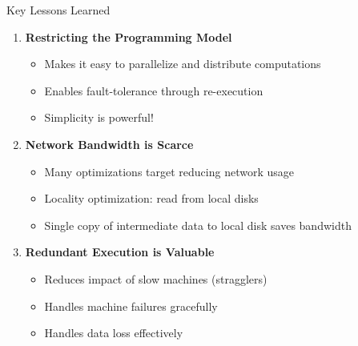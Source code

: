 \documentclass[aspectratio=169]{beamer}
\begin{document}
\begin{frame}{Key Lessons Learned}
\begin{enumerate}
    \item \textbf{Restricting the Programming Model}
    \begin{itemize}
        \item Makes it easy to parallelize and distribute computations
        \item Enables fault-tolerance through re-execution
        \item Simplicity is powerful!
    \end{itemize}

    \vspace{0.3cm}

    \item \textbf{Network Bandwidth is Scarce}
    \begin{itemize}
        \item Many optimizations target reducing network usage
        \item Locality optimization: read from local disks
        \item Single copy of intermediate data to local disk saves bandwidth
    \end{itemize}

    \vspace{0.3cm}

    \item \textbf{Redundant Execution is Valuable}
    \begin{itemize}
        \item Reduces impact of slow machines (stragglers)
        \item Handles machine failures gracefully
        \item Handles data loss effectively
    \end{itemize}
\end{enumerate}
\end{frame}
\end{document}
